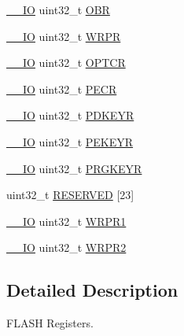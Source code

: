 \begin{DoxyCompactItemize}
\item 
\hyperlink{group___c_m_s_i_s__core__definitions_gaec43007d9998a0a0e01faede4133d6be}{\-\_\-\-\_\-\-I\-O} uint32\-\_\-t \hyperlink{struct_f_l_a_s_h___type_def_a24dece1e3b3185456afe34c3dc6add2e}{O\-B\-R}
\item 
\hyperlink{group___c_m_s_i_s__core__definitions_gaec43007d9998a0a0e01faede4133d6be}{\-\_\-\-\_\-\-I\-O} uint32\-\_\-t \hyperlink{struct_f_l_a_s_h___type_def_ac1889c0e17d868ab991f267ceb9dbb4b}{W\-R\-P\-R}
\item 
\hyperlink{group___c_m_s_i_s__core__definitions_gaec43007d9998a0a0e01faede4133d6be}{\-\_\-\-\_\-\-I\-O} uint32\-\_\-t \hyperlink{struct_f_l_a_s_h___type_def_a54026c3b5bc2059f1b187acb6c4817ac}{O\-P\-T\-C\-R}
\item 
\hyperlink{group___c_m_s_i_s__core__definitions_gaec43007d9998a0a0e01faede4133d6be}{\-\_\-\-\_\-\-I\-O} uint32\-\_\-t \hyperlink{struct_f_l_a_s_h___type_def_a58afa3377dd5f4ffa93eb3da4c653cba}{P\-E\-C\-R}
\item 
\hyperlink{group___c_m_s_i_s__core__definitions_gaec43007d9998a0a0e01faede4133d6be}{\-\_\-\-\_\-\-I\-O} uint32\-\_\-t \hyperlink{struct_f_l_a_s_h___type_def_a17d6fcde53db4cb932b3fbfe08235b31}{P\-D\-K\-E\-Y\-R}
\item 
\hyperlink{group___c_m_s_i_s__core__definitions_gaec43007d9998a0a0e01faede4133d6be}{\-\_\-\-\_\-\-I\-O} uint32\-\_\-t \hyperlink{struct_f_l_a_s_h___type_def_a3c470f54858e246365f56e5fe4d2a618}{P\-E\-K\-E\-Y\-R}
\item 
\hyperlink{group___c_m_s_i_s__core__definitions_gaec43007d9998a0a0e01faede4133d6be}{\-\_\-\-\_\-\-I\-O} uint32\-\_\-t \hyperlink{struct_f_l_a_s_h___type_def_a98a43d6cc0dfca44214d5e78115e8c51}{P\-R\-G\-K\-E\-Y\-R}
\item 
uint32\-\_\-t \hyperlink{struct_f_l_a_s_h___type_def_a687f734afedcd12821de90664b55a542}{R\-E\-S\-E\-R\-V\-E\-D} \mbox{[}23\mbox{]}
\item 
\hyperlink{group___c_m_s_i_s__core__definitions_gaec43007d9998a0a0e01faede4133d6be}{\-\_\-\-\_\-\-I\-O} uint32\-\_\-t \hyperlink{struct_f_l_a_s_h___type_def_a8f94f0938663804b2d9de2002a4e7e67}{W\-R\-P\-R1}
\item 
\hyperlink{group___c_m_s_i_s__core__definitions_gaec43007d9998a0a0e01faede4133d6be}{\-\_\-\-\_\-\-I\-O} uint32\-\_\-t \hyperlink{struct_f_l_a_s_h___type_def_a79b0e64b11e40d304573f0b501355aab}{W\-R\-P\-R2}
\end{DoxyCompactItemize}


\subsection{Detailed Description}
F\-L\-A\-S\-H Registers. 

